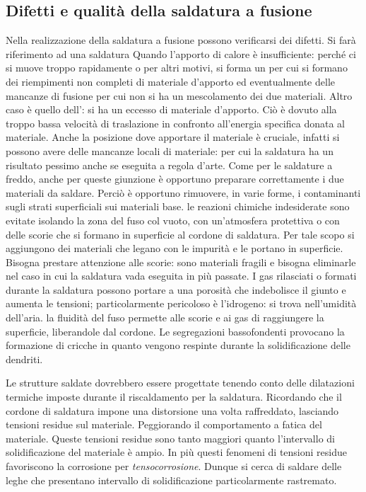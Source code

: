 \subsection{Difetti e qualità della saldatura a fusione}
Nella realizzazione della saldatura a fusione possono verificarsi dei difetti.
Si farà riferimento ad una saldatura\todo{\\aggiungi}
Quando l'apporto di calore è insufficiente: perché ci si muove troppo rapidamente o per altri motivi, si forma un  per cui si formano dei riempimenti non completi di materiale d'apporto ed eventualmente delle mancanze di fusione per cui non si ha un mescolamento dei due materiali.
Altro caso è quello dell': si ha un eccesso di materiale d'apporto. Ciò è dovuto alla troppo bassa velocità di traslazione in confronto all'energia specifica donata al materiale.
Anche la posizione dove apportare il materiale è cruciale, infatti si possono avere delle mancanze locali di materiale: per cui la saldatura ha un risultato pessimo anche se eseguita a regola d'arte.
Come per le saldature a freddo, anche per queste giunzione è opportuno preparare correttamente i due materiali da saldare. Perciò è opportuno rimuovere, in varie forme, i contaminanti sugli strati superficiali sui materiali base.
le reazioni chimiche indesiderate sono evitate isolando la zona del fuso col vuoto, con un'atmosfera protettiva o con delle scorie che si formano in superficie al cordone di saldatura. Per tale scopo si aggiungono dei materiali che legano con le impurità e le portano in superficie.
Bisogna prestare attenzione alle scorie: sono materiali fragili e bisogna eliminarle nel caso in cui la saldatura vada eseguita in più passate.
I gas rilasciati o formati durante la saldatura possono portare a una porosità che indebolisce il giunto e aumenta le tensioni; particolarmente pericoloso è l'idrogeno: si trova nell'umidità dell'aria.
la fluidità del fuso permette alle scorie e ai gas di raggiungere la superficie, liberandole dal cordone.
Le segregazioni bassofondenti provocano la formazione di cricche in quanto vengono respinte durante la solidificazione delle dendriti.

Le strutture saldate dovrebbero essere progettate tenendo conto delle dilatazioni termiche imposte durante il riscaldamento per la saldatura.
Ricordando che il cordone di saldatura impone una distorsione una volta raffreddato, lasciando tensioni residue sul materiale. Peggiorando il comportamento a fatica del materiale.
Queste tensioni residue sono tanto maggiori quanto l'intervallo di solidificazione del materiale è ampio. 
In più questi fenomeni di tensioni residue favoriscono la corrosione per \textit{tensocorrosione}.
Dunque si cerca di saldare delle leghe che presentano intervallo di solidificazione particolarmente rastremato.

